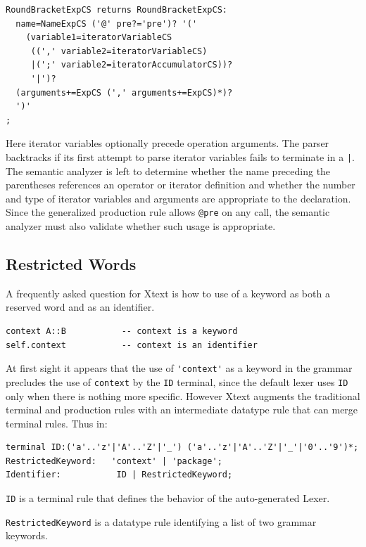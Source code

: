 \documentclass{eceasst}
\begin{document}
{\small\begin{verbatim}
RoundBracketExpCS returns RoundBracketExpCS:
  name=NameExpCS ('@' pre?='pre')? '('
    (variable1=iteratorVariableCS
     ((',' variable2=iteratorVariableCS)
     |(';' variable2=iteratorAccumulatorCS))?
     '|')?
  (arguments+=ExpCS (',' arguments+=ExpCS)*)?
  ')'
;
\end{verbatim}}

Here iterator variables optionally precede operation arguments. The parser backtracks if its first attempt to parse iterator variables fails to terminate in a \verb+|+. The semantic analyzer is left to determine whether the name preceding the parentheses references an operator or iterator definition and whether the number and type of iterator variables and arguments are appropriate to the declaration. Since the generalized production rule allows \verb+@pre+ on any call, the semantic analyzer must also validate whether such usage is appropriate.

\subsection{Restricted Words}

A frequently asked question for Xtext is how to use of a keyword as both a reserved word and as an identifier. 

{\small\begin{verbatim}
context A::B           -- context is a keyword
self.context           -- context is an identifier
\end{verbatim}}

At first sight it appears that the use of \verb+'context'+ as a keyword in the grammar precludes the use of \verb+context+ by the \verb+ID+ terminal, since the default lexer uses \verb+ID+ only when there is nothing more specific. However Xtext augments the traditional terminal and production rules with an intermediate datatype rule that can merge terminal rules. Thus in:

{\small\begin{verbatim}
terminal ID:('a'..'z'|'A'..'Z'|'_') ('a'..'z'|'A'..'Z'|'_'|'0'..'9')*;
RestrictedKeyword:   'context' | 'package';
Identifier:           ID | RestrictedKeyword;
\end{verbatim}}
 
\noindent
\verb+ID+ is a terminal rule that defines the behavior of the auto-generated Lexer.

\verb+RestrictedKeyword+ is a datatype rule identifying a list of two grammar keywords.
\end{document}
